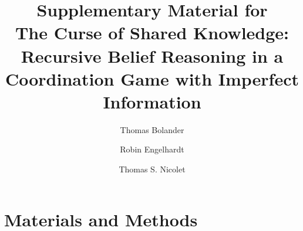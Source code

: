 \documentclass[a4paper,superscriptaddress,nofootinbib]{revtex4}
\begin{document}
\title{Supplementary Material for \\
The Curse of Shared Knowledge: Recursive Belief Reasoning in a Coordination Game with Imperfect Information}
\author{Thomas Bolander}
\author{Robin Engelhardt}
\author{Thomas S. Nicolet}

\maketitle

\section{Materials and Methods}
\end{document}
